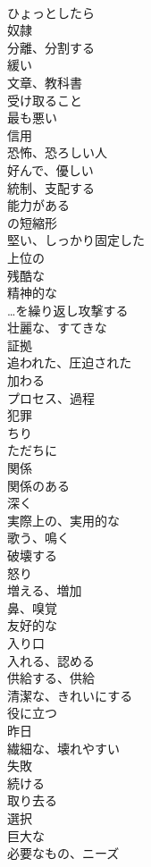 \documentclass[8pt]{extreport}
\begin{document}
\begin{CJK}{UTF8}{min}
\\	ひょっとしたら
\\	奴隷
\\	分離、分割する
\\	緩い
\\	文章、教科書
\\	受け取ること
\\	最も悪い
\\	信用
\\	恐怖、恐ろしい人
\\	好んで、優しい
\\	統制、支配する
\\	能力がある
\\	の短縮形
\\	堅い、しっかり固定した
\\	上位の
\\	残酷な
\\	精神的な
\\	…を繰り返し攻撃する
\\	壮麗な、すてきな
\\	証拠
\\	追われた、圧迫された
\\	加わる
\\	プロセス、過程
\\	犯罪
\\	ちり
\\	ただちに
\\	関係
\\	関係のある
\\	深く
\\	実際上の、実用的な
\\	歌う、鳴く
\\	破壊する
\\	怒り
\\	増える、増加
\\	鼻、嗅覚
\\	友好的な
\\	入り口
\\	入れる、認める
\\	供給する、供給
\\	清潔な、きれいにする
\\	役に立つ
\\	昨日
\\	繊細な、壊れやすい
\\	失敗
\\	続ける
\\	取り去る
\\	選択
\\	巨大な
\\	必要なもの、ニーズ

\end{CJK}
\end{document}
